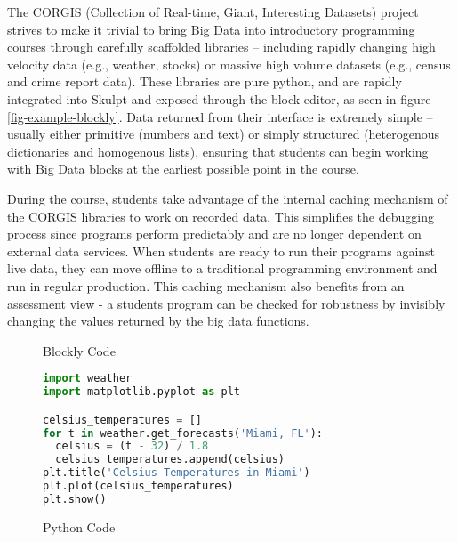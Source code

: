 \documentclass{sig-alternate}
\begin{document}
The CORGIS (Collection of Real-time, Giant, Interesting Datasets) project strives to make it trivial to bring Big Data into introductory programming courses through carefully scaffolded libraries -- including rapidly changing high velocity data (e.g., weather, stocks) or massive high volume datasets (e.g., census and crime report data).
These libraries are pure python, and are rapidly integrated into Skulpt and exposed through the block editor, as seen in figure \ref{fig-example-blockly}.
Data returned from their interface is extremely simple -- usually either primitive (numbers and text) or simply structured (heterogenous dictionaries and homogenous lists), ensuring that students can begin working with Big Data blocks at the earliest possible point in the course.

During the course, students take advantage of the internal caching mechanism of the CORGIS libraries to work on recorded data.
This simplifies the debugging process since programs perform predictably and are no longer dependent on external data services.
When students are ready to run their programs against live data, they can move offline to a traditional programming environment and run in regular production.
This caching mechanism also benefits from an assessment view - a students program can be checked for robustness by invisibly changing the values returned by the big data functions.

\begin{figure*}[ht]
\centering
\begin{minipage}[b]{0.45\linewidth}
\caption{Blockly Code}
\label{fig-example-blockly}
\end{minipage}
\quad
\begin{minipage}[b]{0.45\linewidth}
\begin{lstlisting}[language=Python, showstringspaces=false, columns=fullflexible]
import weather
import matplotlib.pyplot as plt

celsius_temperatures = []
for t in weather.get_forecasts('Miami, FL'):
  celsius = (t - 32) / 1.8
  celsius_temperatures.append(celsius)
plt.title('Celsius Temperatures in Miami')
plt.plot(celsius_temperatures)
plt.show()
\end{lstlisting}
\caption{Python Code}
\label{fig-example-python}
\end{minipage}
\end{figure*}
\end{document}
